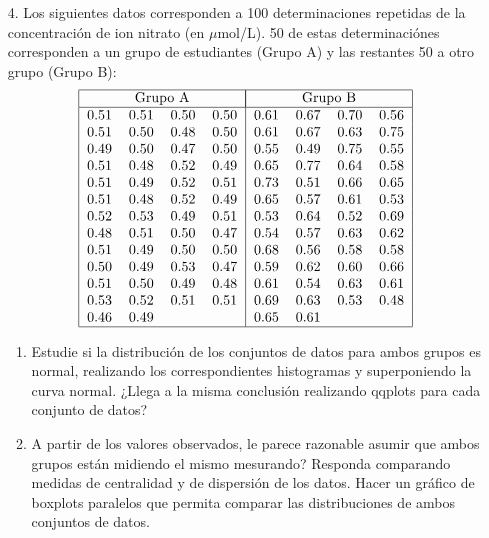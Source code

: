 \documentclass[a4paper, 11pt]{article}
\begin{document}
\begin{enumerate}
\begin{enumerate}
\end{enumerate}


\item[4.] Los siguientes datos corresponden a 100 determinaciones repetidas de
la concentración de ion nitrato (en $\mu$mol/L). 50 de estas determinaciónes corresponden a
un grupo de estudiantes (Grupo A) y las restantes 50 a otro grupo (Grupo B):%
\[%
\begin{tabular}
[c]{|cccc|cccc|}\hline
\multicolumn{4}{|c|}{Grupo A} & \multicolumn{4}{|c|}{Grupo B}\\\hline
0.51 & 0.51 & 0.50 & 0.50 & 0.61 & 0.67 & 0.70 & 0.56\\
0.51 & 0.50 & 0.48 & 0.50 & 0.61 & 0.67 & 0.63 & 0.75\\
0.49 & 0.50 & 0.47 & 0.50 & 0.55 & 0.49 & 0.75 & 0.55\\
0.51 & 0.48 & 0.52 & 0.49 & 0.65 & 0.77 & 0.64 & 0.58\\
0.51 & 0.49 & 0.52 & 0.51 & 0.73 & 0.51 & 0.66 & 0.65\\
0.51 & 0.48 & 0.52 & 0.49 & 0.65 & 0.57 & 0.61 & 0.53\\
0.52 & 0.53 & 0.49 & 0.51 & 0.53 & 0.64 & 0.52 & 0.69\\
0.48 & 0.51 & 0.50 & 0.47 & 0.54 & 0.57 & 0.63 & 0.62\\
0.51 & 0.49 & 0.50 & 0.50 & 0.68 & 0.56 & 0.58 & 0.58\\
0.50 & 0.49 & 0.53 & 0.47 & 0.59 & 0.62 & 0.60 & 0.66\\
0.51 & 0.50 & 0.49 & 0.48 & 0.61 & 0.54 & 0.63 & 0.61\\
0.53 & 0.52 & 0.51 & 0.51 & 0.69 & 0.63 & 0.53 & 0.48\\
0.46 & 0.49 &  &  & 0.65 & 0.61 &  & \\\hline
\end{tabular}
\
\]




\begin{enumerate}
\item Estudie si la distribución de los conjuntos de datos para ambos
grupos es normal, realizando los correspondientes histogramas y superponiendo
la curva normal. ¿Llega a la misma conclusión realizando qqplots para cada conjunto de datos?


\item \textquestiondown A partir de los valores observados, le parece razonable asumir que ambos grupos están midiendo el mismo mesurando? Responda comparando medidas de centralidad y de
dispersión de los datos. Hacer un gráfico de boxplots paralelos que permita comparar las distribuciones de ambos conjuntos de datos.
\end{enumerate}



\end{enumerate}
\end{document}
